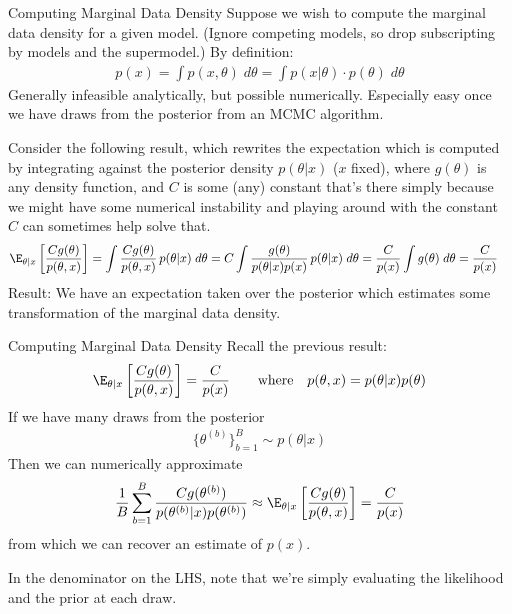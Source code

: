 \documentclass[aspectratio=169, handout]{beamer}
\begin{document}
{\footnotesize
\begin{frame}{Computing Marginal Data Density}
Suppose we wish to compute the \alert{marginal data density}
for a given model.
(Ignore competing models, so drop subscripting by models and the
supermodel.)
By definition:
\begin{align*}
  p(x)
  =
  \int p(x,\theta)\;d\theta
  =
  \int p(x|\theta)\cdot p(\theta)\;d\theta
\end{align*}
Generally infeasible analytically, but possible \alert{numerically}.
Especially easy once we have draws from the posterior from an MCMC
algorithm.

Consider the following result, which rewrites the expectation which
is computed by integrating against the posterior density $p(\theta|x)$
($x$ fixed), where $g(\theta)$ is
any density function, and $C$ is some (any) constant that's there simply
because we might have some numerical instability and playing around with
the constant $C$ can sometimes help solve that.
\begin{align*}
  \E_{\theta|x}\left[
    \frac{C g(\theta)}{p(\theta,x)}
  \right]
  &=
  \int
  \frac{C g(\theta)}{p(\theta,x)}
  \,
  p(\theta|x)\;d\theta
  =
  C
  \int
  \frac{g(\theta)}{p(\theta|x)p(x)}
  \,
  p(\theta|x)\;d\theta
  =
  \frac{C}{p(x)}
  \int
  g(\theta)
  \;d\theta
  =
  \frac{C}{p(x)}
\end{align*}
\alert{Result}:
We have an \alert{expectation} taken over the \alert{posterior}
which \alert{estimates} some transformation of the
\alert{marginal data density}.
\end{frame}
}



{\footnotesize
\begin{frame}{Computing Marginal Data Density}
Recall the previous result:
\begin{align*}
  \E_{\theta|x}\left[
    \frac{C g(\theta)}{p(\theta,x)}
  \right]
  =
  \frac{C}{p(x)}
  \qquad \text{where}\quad
  p(\theta,x)
  =p(\theta|x)p(\theta)
\end{align*}
If we have many draws from the posterior
\begin{align*}
  \{\theta^{(b)}\}_{b=1}^B
  \sim
  p(\theta|x)
\end{align*}
Then we can numerically approximate
\begin{align*}
  \frac{1}{B}
  \sum_{b=1}^B
  \frac{C g(\theta^{(b)})}{p(\theta^{(b)}|x)p(\theta^{(b)})}
  \approx
  \E_{\theta|x}\left[
    \frac{C g(\theta)}{p(\theta,x)}
  \right]
  =
  \frac{C}{p(x)}
\end{align*}
from which we can recover an estimate of $p(x)$.

In the denominator on the LHS, note that we're simply evaluating the
likelihood and the prior at each draw.
\end{frame}
}
\end{document}
